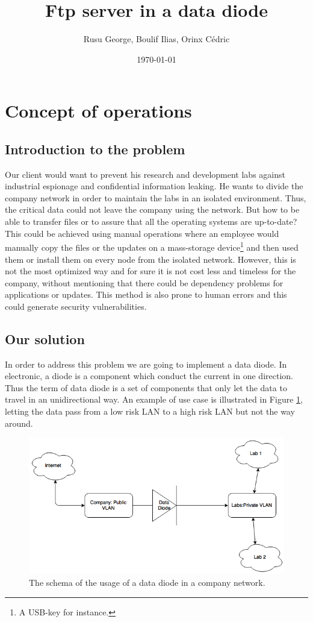 \documentclass[a4paper,10pt]{article}
\title{Ftp server in a data diode}
\author{Rusu George, Boulif Ilias, Orinx Cédric}
\date{\today}
\begin{document}
\maketitle
\newpage
\tableofcontents
\newpage
\section{Concept of operations}
\subsection{Introduction to the problem}
Our client would want to prevent his research and development labs against industrial espionage and confidential information leaking. He wants to divide the company network in order to maintain the labs in an isolated environment. Thus, the critical data could not leave the company using the network. But how to be able to transfer files or to assure that all the operating systems are up-to-date? This could be achieved using manual operations where an employee would manually copy the files or the updates on a mass-storage device\footnote{A USB-key for instance.} and then used them or install them on every node from the isolated network. However, this is not the most optimized way and for sure it is not cost less and timeless for the company, without mentioning that there could be dependency problems for applications or updates. This method is also prone to human errors and this could generate security vulnerabilities.

\subsection{Our solution}
In order to address this problem we are going to implement a data diode. In electronic, a diode is a component which conduct the current in one direction. Thus the term of data diode is a set of components that only let the data to travel in an unidirectional way. An example of use case is illustrated in Figure \ref{fig:datadiode}, letting the data pass from a low risk LAN to a high risk LAN but not the way around.

\begin{figure}
\centering
\includegraphics[scale=0.45]{images/dataDiode.png}
\caption{The schema of the usage of a data diode in a company network.}
\label{fig:datadiode}
\end{figure}
\end{document}
